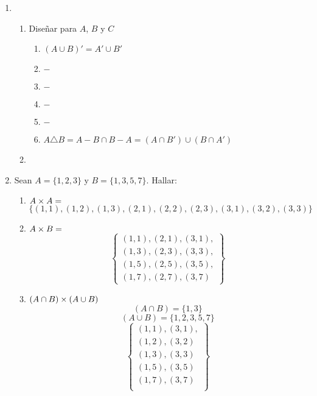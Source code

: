 \documentclass[../practica.root.tex]{subfiles}
\begin{document}
\begin{enumerate}
    \item \begin{enumerate}
              \item Diseñar para $A$, $B$ y $C$
                    \begin{enumerate}
                        \item $(A \cup B)' = A' \cup B'$
                        \item $-$
                        \item $-$
                        \item $-$
                        \item $-$
                        \item $A \triangle B = A-B \cap B -A = (A \cap B') \cup (B \cap A')$
                    \end{enumerate}
              \item
          \end{enumerate}

    \item Sean $A = \{1, 2, 3\}$ y $B = \{1, 3, 5, 7\}$. Hallar:
          \begin{enumerate}
              \item $A \times A =$
                    \[ \{ (1, 1), (1, 2), (1, 3), (2, 1), (2, 2), (2, 3), (3, 1), (3, 2), (3, 3) \} \]
              \item $A \times B = $
                    \[
                        \begin{Bmatrix}
                            (1, 1), (2, 1), (3, 1), \\
                            (1, 3), (2, 3), (3, 3), \\
                            (1, 5), (2, 5), (3, 5), \\
                            (1, 7), (2, 7), (3, 7)
                        \end{Bmatrix}
                    \]
              \item $(A \cap B) \times (A \cup B)$
                    \[ (A \cap B) = \{ 1, 3 \} \]
                    \[ (A \cup B) = \{ 1, 2, 3, 5, 7 \} \]
                    \[
                        \begin{Bmatrix}
                            (1,1),(3,1), \\
                            (1,2),(3,2)  \\
                            (1,3),(3,3)  \\
                            (1,5),(3,5)  \\
                            (1,7),(3,7)  \\
                        \end{Bmatrix}
                    \]
          \end{enumerate}


\end{enumerate}
\end{document}
